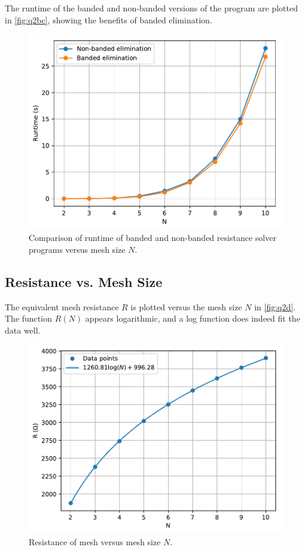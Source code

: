 \documentclass[a4paper,titlepage]{article}
\begin{document}
	The runtime of the banded and non-banded versions of the program are plotted in \autoref{fig:q2bc}, showing the benefits of banded elimination.

	\begin{figure}[!htb]
		\centering
		\includegraphics[width=\columnwidth]{plots/q2bc.pdf}
		\caption
		{Comparison of runtime of banded and non-banded resistance solver programs versus mesh size $N$.}
		\label{fig:q2bc}
	\end{figure}
	
	\subsection{Resistance vs. Mesh Size}
	
	The equivalent mesh resistance $R$ is plotted versus the mesh size $N$ in \autoref{fig:q2d}. The function $R(N)$ appears logarithmic, and a log function does indeed fit the data well.
	
	\begin{figure}[!htb]
		\centering
		\includegraphics[width=\columnwidth]{plots/q2d.pdf}
		\caption
		{Resistance of mesh versus mesh size $N$.}
		\label{fig:q2d}
	\end{figure}
	
\end{document}
